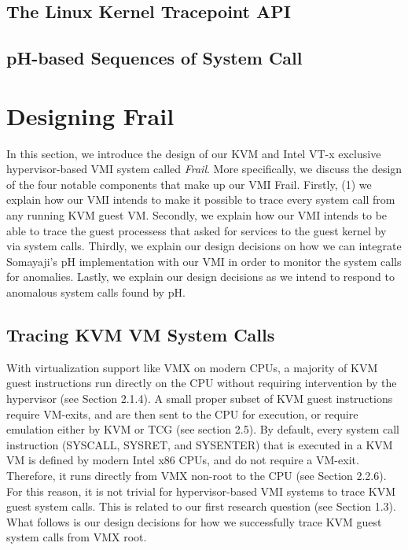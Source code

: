 \documentclass{report}
\begin{document}
\begin{spacing}{1.5}
\section{The Linux Kernel Tracepoint API}





\section{pH-based Sequences of System Call}



\chapter{Designing Frail}

{\large
In this section, we introduce the design of our KVM and Intel VT-x exclusive hypervisor-based VMI system called \textit{Frail}. More specifically, we discuss the design of the four notable components that make up our VMI Frail. Firstly, (1) we explain how our VMI intends to make it possible to trace every system call from any running KVM guest VM. Secondly, we explain how our VMI intends to be able to trace the guest processess that asked for services to the guest kernel by via system calls. Thirdly, we explain our design decisions on how we can integrate Somayaji's pH implementation with our VMI in order to monitor the system calls for anomalies. Lastly, we explain our design decisions as we intend to respond to anomalous system calls found by pH. 
\newline
}

\section{Tracing KVM VM System Calls}
{\large
With virtualization support like VMX on modern CPUs, a majority of KVM guest instructions run directly on the CPU without requiring intervention by the hypervisor (see Section 2.1.4). A small proper subset of KVM guest instructions require VM-exits, and are then sent to the CPU for execution, or require emulation either by KVM or TCG (see section 2.5). By default, every system call instruction (SYSCALL, SYSRET, and SYSENTER) that is executed in a KVM VM is defined by modern Intel x86 CPUs, and do not require a VM-exit. Therefore, it runs directly from VMX non-root to the CPU (see Section 2.2.6). For this reason, it is not trivial for hypervisor-based VMI systems to trace KVM guest system calls. This is related to our first research question (see Section 1.3). What follows is our design decisions for how we successfully trace KVM guest system calls from VMX root.
\newline
}



\end{spacing}
\end{document}

